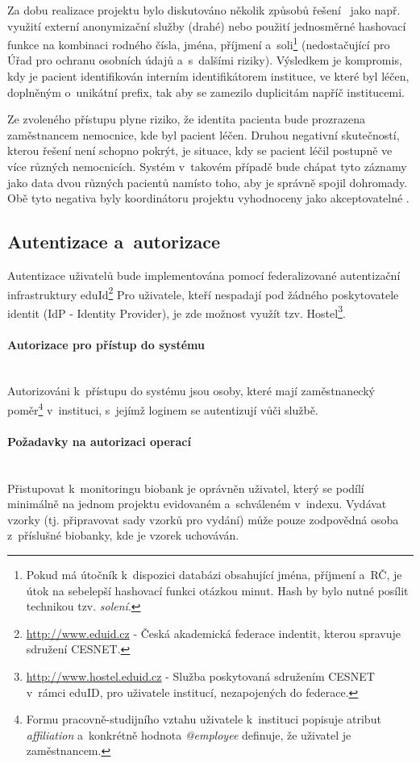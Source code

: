 \documentclass[11pt, draft, oneside]{fithesis2}
\newcommand{\paragraphNewLine}[1]{\paragraph*{#1}\mbox{}\\}
\begin{document}
Za dobu realizace projektu bylo diskutováno několik způsobů řešení~\cite{ARCH_2014_1_25} jako např. využití externí anonymizační služby (drahé) nebo použití jednosměrné hashovací funkce na kombinaci rodného čísla, jména, příjmení a~soli\footnote{Pokud má útočník k~dispozici databázi obsahující jména, příjmení a~RČ, je útok  na sebelepší hashovací funkci otázkou minut. Hash by bylo nutné posílit technikou tzv. \textit{solení}.} (nedostačující pro Úřad pro ochranu osobních údajů a~s~dalšími riziky). 
Výsledkem je kompromis, kdy je pacient identifikován interním identifikátorem instituce, ve které byl léčen, doplněným o~unikátní prefix, tak aby se zamezilo duplicitám napříč institucemi.

Ze zvoleného přístupu plyne riziko, že identita pacienta bude prozrazena zaměstnancem nemocnice, kde byl pacient léčen. Druhou negativní skutečností, kterou řešení není schopno pokrýt, je situace, kdy se pacient léčil postupně ve více různých nemocnicích. Systém v~takovém případě bude chápat tyto záznamy jako data dvou různých pacientů namísto toho, aby je správně spojil dohromady. Obě tyto negativa byly koordinátoru projektu vyhodnoceny jako akceptovatelné .

\subsection{Autentizace a~autorizace}
Autentizace uživatelů bude implementována pomocí federalizované autentizační infrastruktury eduId\footnote{\url{http://www.eduid.cz} - Česká akademická federace indentit, kterou spravuje sdružení CESNET.} Pro uživatele, kteří nespadají pod žádného poskytovatele identit (IdP - Identity Provider), je zde možnost využít tzv. Hostel\footnote{\url{http://www.hostel.eduid.cz} - Služba poskytovaná sdružením CESNET v~rámci eduID, pro uživatele institucí, nezapojených do federace.}. 

\paragraphNewLine{Autorizace pro přístup do systému}
Autorizováni k~přístupu do systému jsou osoby, které mají zaměstnanecký poměr\footnote{Formu pracovně-studijního vztahu uživatele k~instituci popisuje atribut \textit{affiliation} a~konkrétně hodnota \textit{@employee} definuje, že uživatel je zaměstnancem.} v~instituci, s~jejímž loginem se autentizují vůči službě.

\paragraphNewLine{Požadavky na autorizaci operací}
Přistupovat k~monitoringu biobank je oprávněn uživatel, který se podílí minimálně na jednom projektu evidovaném a~schváleném v~indexu.
Vydávat vzorky (tj. připravovat sady vzorků pro vydání) může pouze zodpovědná osoba z~příslušné biobanky, kde je vzorek uchováván.
\end{document}

